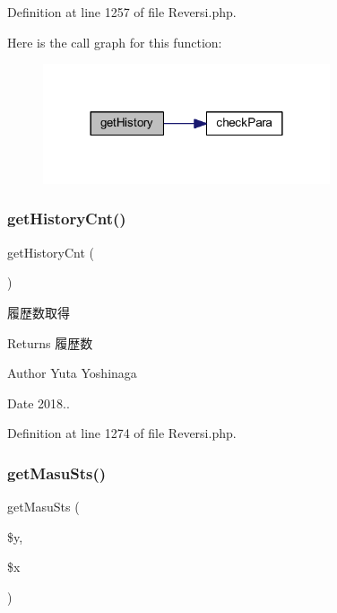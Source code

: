 Definition at line 1257 of file Reversi.\+php.

Here is the call graph for this function\+:\nopagebreak
\begin{figure}[H]
\begin{center}
\leavevmode
\includegraphics[width=240pt]{class_reversi_a41cae82a798f2b3d0684bda44b837fcf_cgraph}
\end{center}
\end{figure}
\mbox{\label{class_reversi_a004834cf9f95ab56b62c1305bbc68ce2}} 
\subsubsection{\texorpdfstring{get\+History\+Cnt()}{getHistoryCnt()}}
{\footnotesize\ttfamily get\+History\+Cnt (\begin{DoxyParamCaption}{ }\end{DoxyParamCaption})}



履歴数取得 

\begin{DoxyReturn}{Returns}
履歴数 
\end{DoxyReturn}
\begin{DoxyAuthor}{Author}
Yuta Yoshinaga 
\end{DoxyAuthor}
\begin{DoxyDate}{Date}
2018.. 
\end{DoxyDate}


Definition at line 1274 of file Reversi.\+php.

\mbox{\label{class_reversi_a1baed538e7a503cd51850d368b9e65f7}} 
\subsubsection{\texorpdfstring{get\+Masu\+Sts()}{getMasuSts()}}
{\footnotesize\ttfamily get\+Masu\+Sts (\begin{DoxyParamCaption}\item[{}]{\$y,  }\item[{}]{\$x }\end{DoxyParamCaption})}



